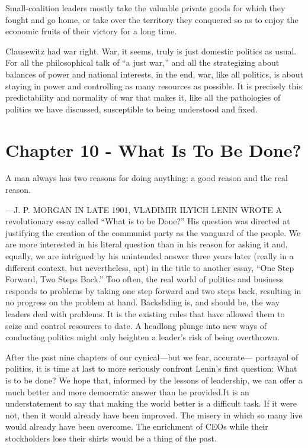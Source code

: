 \documentclass[10pt]{article}
\begin{document}
{\large Small-coalition leaders mostly take the valuable private goods for which
they fought and go home, or take over the territory they conquered so as to enjoy
the economic fruits of their victory for a long time.}

{\large Clausewitz had war right. War, it seems, truly is just domestic politics
as usual. For all the philosophical talk of ``a just war,'' and all the
strategizing about balances of power and national interests, in the end, war,
like all politics, is about staying in power and controlling as many resources as
possible. It is precisely this predictability and normality of war that makes it,
like all the pathologies of politics we have discussed, susceptible to being
understood and fixed.}
\pagebreak{}


\section{Chapter 10 - What Is To Be Done?}

{\large A man always has two reasons for doing anything: a good reason and the
real reason.}

{\large ---J. P. MORGAN IN LATE 1901, VLADIMIR ILYICH LENIN WROTE A
revolutionary essay called ``What is to be Done?'' His question was directed at
justifying the creation of the communist party as the vanguard of the people. We
are more interested in his literal question than in his reason for asking it and,
equally, we are intrigued by his unintended answer three years later (really in a
different context, but nevertheless, apt) in the title to another essay, ``One
Step Forward, Two Steps Back.'' Too often, the real world of politics and
business responds to problems by taking one step forward and two steps back,
resulting in no progress on the problem at hand. Backsliding is, and should be,
the way leaders deal with problems. It is the existing rules that have allowed
them to seize and control resources to date. A headlong plunge into new ways of
conducting politics might only heighten a leader's risk of being overthrown.}

{\large After the past nine chapters of our cynical---but we fear, accurate---
portrayal of politics, it is time at last to more seriously confront Lenin's
first question: What is to be done? We hope that, informed by the lessons of
leadership, we can offer a much better and more democratic answer than he
provided.It is an understatement to say that making the world better is a
difficult task. If it were not, then it would already have been improved. The
misery in which so many live would already have been overcome. The enrichment of
CEOs while their stockholders lose their shirts would be a thing of the past.}
\end{document}
